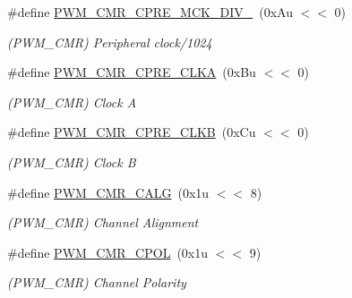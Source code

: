 \begin{DoxyCompactItemize}
\mbox{\label{group__SAMV71__PWM_gafaead3bc15fbccd0c23d23c9f357c33e}} 
\#define \mbox{\hyperlink{group__SAMV71__PWM_gafaead3bc15fbccd0c23d23c9f357c33e}{P\+W\+M\+\_\+\+C\+M\+R\+\_\+\+C\+P\+R\+E\+\_\+\+M\+C\+K\+\_\+\+D\+I\+V\+\_}}~(0x\+Au $<$$<$ 0)
\begin{DoxyCompactList}\small\item\em (P\+W\+M\+\_\+\+C\+MR) Peripheral clock/1024 \end{DoxyCompactList}\item 
\mbox{\label{group__SAMV71__PWM_ga8bc71e46b25f8e3523370fac72f5d033}} 
\#define \mbox{\hyperlink{group__SAMV71__PWM_ga8bc71e46b25f8e3523370fac72f5d033}{P\+W\+M\+\_\+\+C\+M\+R\+\_\+\+C\+P\+R\+E\+\_\+\+C\+L\+KA}}~(0x\+Bu $<$$<$ 0)
\begin{DoxyCompactList}\small\item\em (P\+W\+M\+\_\+\+C\+MR) Clock A \end{DoxyCompactList}\item 
\mbox{\label{group__SAMV71__PWM_ga61f75d57082c66e697b6e9a0d1c7a871}} 
\#define \mbox{\hyperlink{group__SAMV71__PWM_ga61f75d57082c66e697b6e9a0d1c7a871}{P\+W\+M\+\_\+\+C\+M\+R\+\_\+\+C\+P\+R\+E\+\_\+\+C\+L\+KB}}~(0x\+Cu $<$$<$ 0)
\begin{DoxyCompactList}\small\item\em (P\+W\+M\+\_\+\+C\+MR) Clock B \end{DoxyCompactList}\item 
\mbox{\label{group__SAMV71__PWM_ga389acb2fd3cb962a815dc9bebf0d8c3b}} 
\#define \mbox{\hyperlink{group__SAMV71__PWM_ga389acb2fd3cb962a815dc9bebf0d8c3b}{P\+W\+M\+\_\+\+C\+M\+R\+\_\+\+C\+A\+LG}}~(0x1u $<$$<$ 8)
\begin{DoxyCompactList}\small\item\em (P\+W\+M\+\_\+\+C\+MR) Channel Alignment \end{DoxyCompactList}\item 
\mbox{\label{group__SAMV71__PWM_gaaf63b55ca5a5fca06ef63e14542b6d80}} 
\#define \mbox{\hyperlink{group__SAMV71__PWM_gaaf63b55ca5a5fca06ef63e14542b6d80}{P\+W\+M\+\_\+\+C\+M\+R\+\_\+\+C\+P\+OL}}~(0x1u $<$$<$ 9)
\begin{DoxyCompactList}\small\item\em (P\+W\+M\+\_\+\+C\+MR) Channel Polarity \end{DoxyCompactList}\item 
$$
\end{DoxyCompactItemize}
